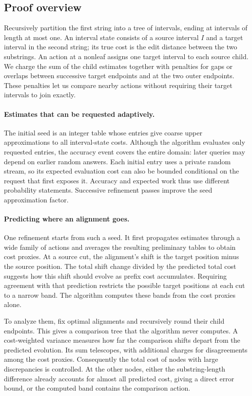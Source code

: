 \subsection{Proof overview}
Recursively partition the first string into a tree of intervals, ending at
intervals of length at most one. An interval state consists of a source
interval $I$ and a target interval in the second string; its true cost is
the edit distance between the two substrings. An action at a nonleaf
assigns one target interval to each source child. We charge the sum of
the child estimates together with penalties for gaps or overlaps between
successive target endpoints and at the two outer endpoints. These
penalties let us compare nearby actions without requiring their target
intervals to join exactly.

\paragraph{Estimates that can be requested adaptively.}
The initial seed is an integer table whose entries give coarse upper
approximations to all interval-state costs. Although the algorithm evaluates
only requested entries, the accuracy event covers the entire domain:
later queries may depend on earlier random answers. Each initial entry
uses a private random stream, so its expected evaluation cost can also
be bounded conditional on the request that first exposes it. Accuracy
and expected work thus use different probability statements. Successive
refinement passes improve the seed approximation factor.

\paragraph{Predicting where an alignment goes.}
One refinement starts from such a seed. It first propagates estimates
through a wide family of actions and averages the resulting preliminary
tables to obtain cost proxies. At a source cut, the alignment's shift is
the target position minus the source position. The total shift change
divided by the predicted total cost suggests how this shift should evolve
as prefix cost accumulates. Requiring agreement with that prediction
restricts the possible target positions at each cut to a narrow band.
The algorithm computes these bands from the cost proxies alone.

To analyze them, fix optimal alignments and recursively round their child
endpoints. This gives a comparison tree that the algorithm never computes.
A cost-weighted variance measures how far the comparison shifts depart
from the predicted evolution. Its sum telescopes, with additional charges
for disagreements among the cost proxies. Consequently the total cost of
nodes with large discrepancies is controlled. At the other nodes, either
the substring-length difference already accounts for almost all predicted
cost, giving a direct error bound, or the computed band contains the
comparison action.

